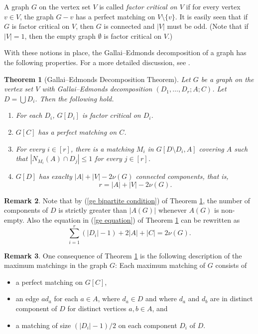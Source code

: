 \documentclass[10pt]{amsart}
\newtheorem{thm}{Theorem}[section]
\theoremstyle{definition}
\newtheorem{remark}[thm]{Remark}
\begin{document}
	A graph $G$ on the vertex set $V$ is called \textit{factor critical on $V$} if for every vertex $v\in V$, the graph $G-v$ has a perfect matching on $V\setminus \{v\}$. It is easily seen that if $G$ is factor critical on $V$, then $G$ is connected and $|V|$ must be odd. (Note that if $|V|=1$, then the empty graph $\emptyset$ is factor critical on $V$.) 
	
	With these notions in place, the Gallai--Edmonds decomposition of a graph has the following properties. For a more detailed discussion, see \cite{lovasz_plummer}. 
	\begin{thm}[Gallai--Edmonds Decomposition Theorem] \label{ge-decomposition}
		Let $G$ be a graph on the vertex set $V$ with Gallai--Edmonds decomposition $(D_1,\dots, D_r;A;C)$. Let $D = \bigcup D_i$. Then the following hold.
		\begin{enumerate}[(1)]
			\item For each $D_i$, $G[D_i]$ is factor critical on $D_i$.
			\item $G[C]$ has a perfect matching on $C$.
			\item \label{ge bipartite condition} For every $i\in [r]$, there is a matching $M_i$ in $G[D\setminus D_i,A]$ covering $A$ such that $|N_{M_i}(A)\cap D_j|\leq 1$ for every $j\in [r]$.
			
			\item \label{ge equation} $G[D]$ has exaclty $|A|+|V| - 2 \nu(G)$ connected components, that is,  
			\[r = |A|+|V| - 2 \nu(G).\]
		\end{enumerate}
	\end{thm}
	
	\begin{remark}
		Note that by (\ref{ge bipartite condition}) of Theorem \ref{ge-decomposition}, the number of components of $D$ is strictly greater than $|A(G)|$ whenever $A(G)$ is non-empty. Also the equation in (\ref{ge equation}) of Theorem \ref{ge-decomposition} can be rewritten as
		\[\textstyle{\sum_{i=1}^r}(|D_i|-1) + 2|A| + |C| = 2\nu(G).\]
	\end{remark}
	
	\begin{remark} \label{ge consequences}
		One consequence of Theorem \ref{ge-decomposition} is the following description of the maximum matchings in the graph $G$: Each maximum matching of $G$ consists of
		\begin{itemize}
			\item a perfect matching on $G[C]$,
			\item an edge $ad_a$ for each $a\in A$, where $d_a \in D$ and where $d_a$ and $d_b$ are in distinct component of $D$ for distinct vertices $a, b\in A$, and
			\item a matching of size $(|D_i|-1)/2$ on each component $D_i$ of $D$.
		\end{itemize}
	\end{remark}
	
\end{document}

